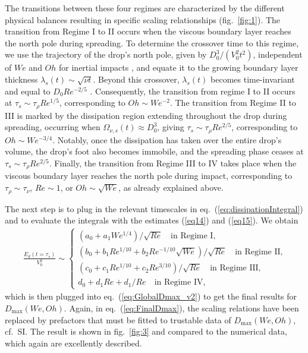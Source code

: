 \documentclass[preprint,amssymb,superscriptaddress,aps,prl,floatfix]{revtex4-1}
\begin{document}
The transitions between these four 
regimes are characterized by the different physical balances resulting in specific scaling relationships (fig.\ \ref{fig:1}). 
The transition from Regime I to II occurs when the viscous boundary layer reaches the north pole during spreading. To determine the crossover time to this regime, we use the trajectory of the drop's north pole, given by $D_0^3/(V_0^2t^2)$, independent of $We$ and $Oh$ for inertial impacts \cite{Eggers2010}, and equate it to the growing boundary layer thickness $\lambda_s(t) \sim \sqrt{\nu t}$. Beyond this crossover, $\lambda_s(t)$ becomes time-invariant and equal to $D_0Re^{-2/5}$ \cite{Eggers2010}. Consequently, the transition from regime I to II occurs at $\tau_s \sim \tau_\rho Re^{1/5}$, corresponding to $Oh \sim We^{-2}$.
The transition from Regime II to III is marked by the dissipation region extending throughout the drop during spreading, occurring when $\Omega_{\nu, s}(t) \approx D_0^3$, giving $\tau_s \sim \tau_\rho Re^{2/5}$, corresponding to $Oh \sim We^{-3/4}$. Notably, once the dissipation has taken over the entire drop's volume, the drop's foot also becomes immobile, and the spreading phase ceases at $\tau_s \sim \tau_\rho Re^{2/5}$.
Finally, the transition from Regime III to IV takes place when the viscous boundary layer reaches the north pole during impact, corresponding to $\tau_\rho \sim \tau_\nu$, $Re \sim 1$, or $Oh \sim \sqrt{We}$, as already explained above.



The next  step is to plug in  the relevant timescales  in eq.\ (\ref{eq:dissipationIntegral}) and to 
evaluate the integrals with the estimates (\ref{eq14}) and (\ref{eq15}).  We obtain 
\begin{align}
	\label{eq:FinalDmax}
	 \frac{E_d(t = \tau_s)}{V_0^2} \sim \begin{cases}
		\left(a_0 + a_1We^{1/4}\right)/\sqrt{Re}\quad\text{in Regime I,}\\
		\left(b_0 + b_1Re^{1/10} + b_2Re^{-1/10}\sqrt{We} \right)/\sqrt{Re}\quad\text{in Regime II,}\\
		\left(c_0 + c_1Re^{1/10} + c_2Re^{3/10}\right)/\sqrt{Re}\quad\text{in Regime III,}\\
		d_0 + d_1Re + d_1/Re\quad\text{in Regime IV,}
	\end{cases}
\end{align}
which is then plugged into eq.\ (\ref{eq:GlobalDmax_v2}) to get the
final results for $D_\text{max} (We, Oh)$. 
Again, in eq.\  (\ref{eq:FinalDmax}),
the 
scaling relations have been replaced by prefactors that must be
fitted to trustable data of $D_\text{max} ( We, Oh )$, cf.\ SI.
The result is shown in fig.~\ref{fig:3} and compared to the numerical
data, which again are excellently described. 
\end{document}
